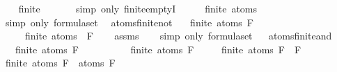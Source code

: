 \begin{isabellebody}
\ \ \isamarkupfalse%
\ {\isachardoublequoteopen}finite\ {\isasymemptyset}{\isachardoublequoteclose}\isanewline
\ \ \ \ \isamarkupfalse%
\ {\isacharparenleft}simp\ only{\isacharcolon}\ finite{\isachardot}emptyI{\isacharparenright}\isanewline
\ \ \isamarkupfalse%
\ \isamarkupfalse%
\ {\isachardoublequoteopen}finite\ {\isacharparenleft}atoms\ {\isasymbottom}{\isacharparenright}{\isachardoublequoteclose}\isanewline
\ \ \ \ \isamarkupfalse%
\ {\isacharparenleft}simp\ only{\isacharcolon}\ formula{\isachardot}set{\isacharparenleft}{}{\isacharparenright}{\isacharparenright}\ \isanewline
{}\isamarkupfalse%
%
\endisatagproof
{\isafoldproof}%
%
\isadelimproof
\isanewline
%
\endisadelimproof
\isanewline
{}\isamarkupfalse%
\ atoms{\isacharunderscore}finite{\isacharunderscore}not{\isacharcolon}\isanewline
\ \ \ {\isachardoublequoteopen}finite\ {\isacharparenleft}atoms\ F{\isacharparenright}{\isachardoublequoteclose}\ \isanewline
\ \ \ \ \ {\isachardoublequoteopen}finite\ {\isacharparenleft}atoms\ {\isacharparenleft}\isactrlbold {\isasymnot}\ F{\isacharparenright}{\isacharparenright}{\isachardoublequoteclose}\isanewline
%
\isadelimproof
\ \ %
\endisadelimproof
%
\isatagproof
{}\isamarkupfalse%
\ assms\isanewline
\ \ \isamarkupfalse%
\ {\isacharparenleft}simp\ only{\isacharcolon}\ formula{\isachardot}set{\isacharparenleft}{}{\isacharparenright}{\isacharparenright}%
\endisatagproof
{\isafoldproof}%
%
\isadelimproof
\ \isanewline
%
\endisadelimproof
\isanewline
{}\isamarkupfalse%
\ atoms{\isacharunderscore}finite{\isacharunderscore}and{\isacharcolon}\isanewline
\ \ \ {\isachardoublequoteopen}finite\ {\isacharparenleft}atoms\ F{}{\isacharparenright}{\isachardoublequoteclose}\isanewline
\ \ \ \ \ \ \ \ \ \ {\isachardoublequoteopen}finite\ {\isacharparenleft}atoms\ F{}{\isacharparenright}{\isachardoublequoteclose}\isanewline
\ \ \ \ \ {\isachardoublequoteopen}finite\ {\isacharparenleft}atoms\ {\isacharparenleft}F{}\ \isactrlbold {\isasymand}\ F{}{\isacharparenright}{\isacharparenright}{\isachardoublequoteclose}\isanewline
%
\isadelimproof
%
\endisadelimproof
%
\isatagproof
{}\isamarkupfalse%
\ {\isacharminus}\isanewline
\ \ \isamarkupfalse%
\ {\isachardoublequoteopen}finite\ {\isacharparenleft}atoms\ F{}\ {\isasymunion}\ atoms\ F{}{\isacharparenright}{\isachardoublequoteclose}\isanewline

\end{isabellebody}
